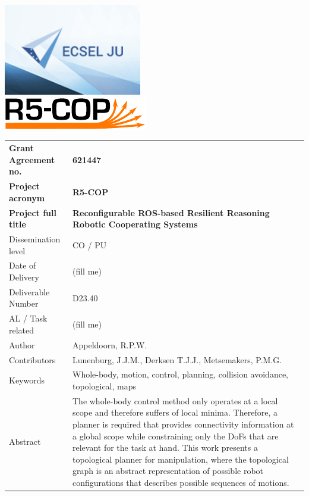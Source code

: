 \thispagestyle{empty}
{\noindent\centering\includegraphics[height=4cm]{pics/ecsel-logo}~~~~~~\\[3cm]}
{\noindent\centering\includegraphics{pics/r5-cop}\\[1cm]}

\begin{tabular}{|p{4.5cm}p{11cm}|}
\hline
\rowcolor[gray]{0.8}
\bf Grant Agreement no.
	& \bf 621447\\
\rowcolor[gray]{0.8}
\bf Project acronym
	& \bf R5-COP\\
\rowcolor[gray]{0.8}
\bf	Project full title
	& \bf Reconfigurable ROS-based Resilient Reasoning Robotic Cooperating Systems\\
\hline

Dissemination level
	& CO / PU\\
Date of Delivery
	& (fill me)\\
Deliverable Number
	& D23.40 \\
AL / Task related
	& (fill me)\\
Author
	& Appeldoorn, R.P.W. \\
Contributors
	& Lunenburg, J.J.M., Derksen T.J.J., Metsemakers, P.M.G.\\
Keywords
	& Whole-body, motion, control, planning, collision avoidance, topological, maps\\
Abstract &
	The whole-body control method only operates at a local scope and therefore suffers of local minima. Therefore, a planner is required that provides connectivity information at a global scope while constraining only the DoFs that are relevant for the task at hand. This work presents a topological planner for manipulation, where the topological graph is an abstract representation of possible robot configurations that describes possible sequences of motions. \\
\hline
\end{tabular}
\vfill\eject
